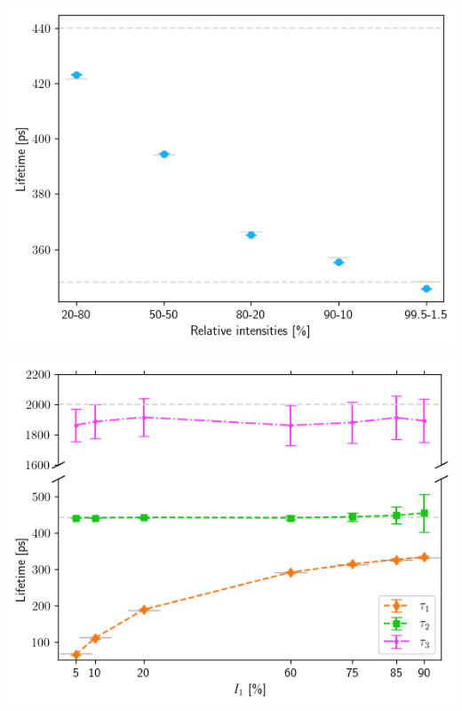  
\begin{minipage}{.47\linewidth}
     
    \includegraphics[width=\linewidth]{Batch 7/348-440/output/1 life/lifetimes.png}
    \label{fig:type4a}
\end{minipage}
\hfill
\begin{minipage}{.47\linewidth}
     
    \includegraphics[width=\linewidth]{Batch 8/442/output/lifetimes.png}
    \label{fig:type4b}
\end{minipage}
 

